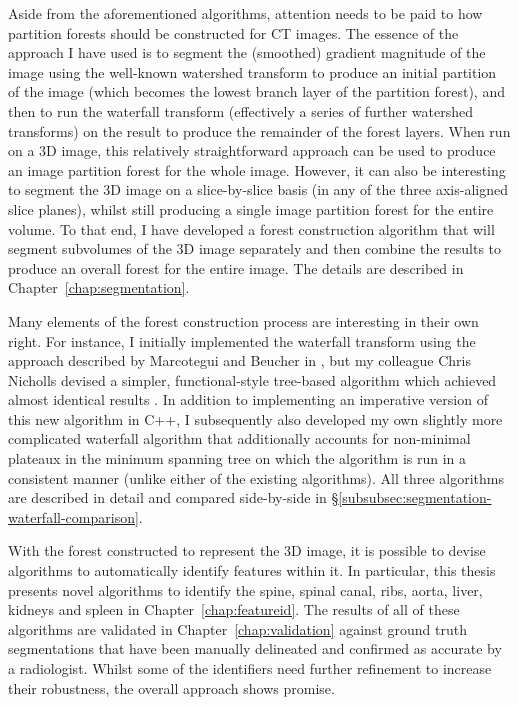 Aside from the aforementioned algorithms, attention needs to be paid to how partition forests should be constructed for CT images. The essence of the approach I have used is to segment the (smoothed) gradient magnitude of the image using the well-known watershed transform \cite{beucher90} to produce an initial partition of the image (which becomes the lowest branch layer of the partition forest), and then to run the waterfall transform \cite{marcotegui05} (effectively a series of further watershed transforms) on the result to produce the remainder of the forest layers. When run on a 3D image, this relatively straightforward approach can be used to produce an image partition forest for the whole image. However, it can also be interesting to segment the 3D image on a slice-by-slice basis (in any of the three axis-aligned slice planes), whilst still producing a single image partition forest for the entire volume. To that end, I have developed a forest construction algorithm that will segment subvolumes of the 3D image separately and then combine the results to produce an overall forest for the entire image. The details are described in Chapter~\ref{chap:segmentation}.

Many elements of the forest construction process are interesting in their own right. For instance, I initially implemented the waterfall transform using the approach described by Marcotegui and Beucher in \cite{marcotegui05}, but my colleague Chris Nicholls devised a simpler, functional-style tree-based algorithm which achieved almost identical results \cite{nicholls09}. In addition to implementing an imperative version of this new algorithm in C++, I subsequently also developed my own slightly more complicated waterfall algorithm that additionally accounts for non-minimal plateaux in the minimum spanning tree on which the algorithm is run in a consistent manner (unlike either of the existing algorithms). All three algorithms are described in detail and compared side-by-side in \S\ref{subsubsec:segmentation-waterfall-comparison}.

With the forest constructed to represent the 3D image, it is possible to devise algorithms to automatically identify features within it. In particular, this thesis presents novel algorithms to identify the spine, spinal canal, ribs, aorta, liver, kidneys and spleen in Chapter~\ref{chap:featureid}. The results of all of these algorithms are validated in Chapter~\ref{chap:validation} against ground truth segmentations that have been manually delineated and confirmed as accurate by a radiologist. Whilst some of the identifiers need further refinement to increase their robustness, the overall approach shows promise.


